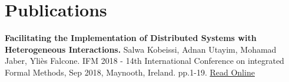 \documentclass{tccv}
\begin{document}
%
%
%
%
%    


\section{Publications}
    
\textbf{Facilitating the Implementation of Distributed Systems with Heterogeneous Interactions.} Salwa Kobeissi, Adnan Utayim, Mohamad Jaber, Yliès Falcone. IFM 2018 - 14th International Conference on integrated Formal Methods, Sep 2018, Maynooth, Ireland. pp.1-19. \href{https://link.springer.com/chapter/10.1007/978-3-319-98938-9_15?fbclid=IwAR3mB_0l1FImySHqTeFfwwBxNwwAB3lfXOTerruuuzMAQN9nHZKYdGKVSzk}{Read Online}
\end{document}
